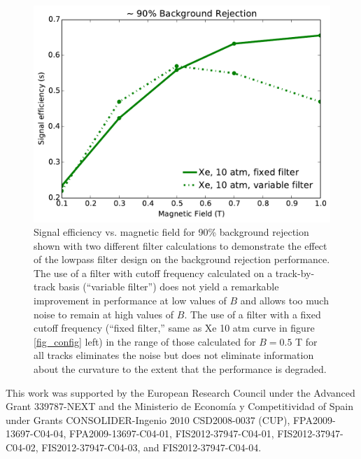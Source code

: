 \documentclass{JINST}
\begin{document}
\begin{figure}[!htb]
	\centering
	\includegraphics[scale=0.43]{fig/eff_vs_b_cf_filter_90.pdf}
	\caption{\label{fig_FIRdependence}Signal efficiency vs. magnetic field for 90\% background rejection shown with two different filter calculations to demonstrate the effect of the lowpass filter design on the background rejection performance.  The use of a filter with cutoff frequency calculated on a track-by-track basis (``variable filter'') does not yield a remarkable improvement in performance at low values of $B$ and allows too much noise to remain at high values of $B$.  The use of a filter with a fixed cutoff frequency (``fixed filter,'' same as Xe 10 atm curve in figure \protect\ref{fig_config} left) in the range of those calculated for $B = 0.5$ T for all tracks eliminates the noise but does not eliminate information about the curvature to the extent that the performance is degraded.}
\end{figure}

\acknowledgments

This work was supported by the European Research Council under the Advanced Grant 339787-NEXT and the Ministerio de Econom\'{i}a y Competitividad of Spain under Grants CONSOLIDER-Ingenio 2010 CSD2008-0037 (CUP), FPA2009-13697-C04-04, FPA2009-13697-C04-01, FIS2012-37947-C04-01, FIS2012-37947-C04-02, FIS2012-37947-C04-03, and FIS2012-37947-C04-04.



\end{document}
